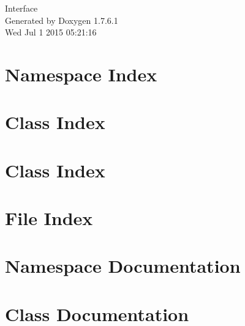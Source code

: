 \documentclass[a4paper]{book}
\begin{document}
\hypersetup{pageanchor=false,citecolor=blue}
\begin{titlepage}
\vspace*{7cm}
\begin{center}
{\Large \-Interface }\\
\vspace*{1cm}
{\large \-Generated by Doxygen 1.7.6.1}\\
\vspace*{0.5cm}
{\small Wed Jul 1 2015 05:21:16}\\
\end{center}
\end{titlepage}
\clearemptydoublepage
{}
\tableofcontents
\clearemptydoublepage
{}
\hypersetup{pageanchor=true,citecolor=blue}
\chapter{\-Namespace \-Index}

\chapter{\-Class \-Index}

\chapter{\-Class \-Index}

\chapter{\-File \-Index}

\chapter{\-Namespace \-Documentation}



\chapter{\-Class \-Documentation}




































\end{document}
